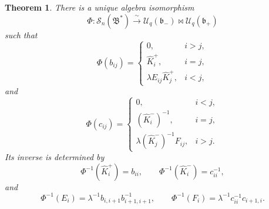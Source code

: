 \documentclass[11pt]{amsart}
\numberwithin{equation}{section}
\newtheorem{theorem}[equation]{Theorem}
\theoremstyle{definition}
\theoremstyle{remark}
\newcommand{\Uc}{\mathcal{U}}
\newcommand{\bcS}{\mathcal{S}}
\newcommand{\fB}{\mathfrak{B}}
\newcommand{\fb}{\mathfrak{b}}
\newcommand{\bipr}{\mathbin{\bowtie}}
\begin{document}
\begin{theorem}\label{thm:main-isomorphism}
There is a unique algebra isomorphism
\[
\Phi:\bcS_n(\fB^*)\xrightarrow{\;\sim\;}
\Uc_q(\fb_-)\bipr\Uc_q(\fb_+)
\]
such that
\begin{equation}\label{eq:Phi-b}
\Phi(b_{ij})=
\begin{cases}
0, & i>j,\\
\widehat K_i^{+}, & i=j,\\
\lambda E_{ij}\widehat K_j^{+}, & i<j,
\end{cases}
\end{equation}
and
\begin{equation}\label{eq:Phi-c}
\Phi(c_{ij})=
\begin{cases}
0, & i<j,\\
(\widehat K_i^{-})^{-1}, & i=j,\\
\lambda(\widehat K_j^{-})^{-1}F_{ij}, & i>j.
\end{cases}
\end{equation}
Its inverse is determined by
\begin{equation}\label{eq:Psi-K}
\Phi^{-1}(\widehat K_i^{+})=b_{ii},
\qquad
\Phi^{-1}(\widehat K_i^{-})=c_{ii}^{-1},
\end{equation}
and
\begin{equation}\label{eq:Psi-EF}
\Phi^{-1}(E_i)
 =\lambda^{-1}b_{i,i+1}b_{i+1,i+1}^{-1},
\qquad
\Phi^{-1}(F_i)
 =\lambda^{-1}c_{ii}^{-1}c_{i+1,i}.
\end{equation}
\end{theorem}
\end{document}

